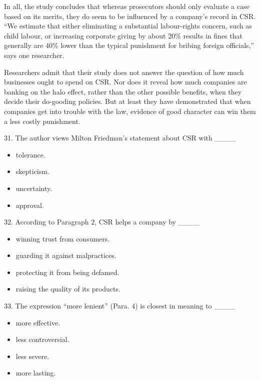 \documentclass[UTF8,11pt]{ctexart}
\begin{document}
In all, the study concludes that whereas prosecutors should only evaluate a case based on its merits, they do seem to be influenced by a company’s record in CSR. “We estimate that either eliminating a substantial labour-rights concern, such as child labour, or increasing corporate giving by about 20\% results in fines that generally are 40\% lower than the typical punishment for bribing foreign officials,” says one researcher.


Researchers admit that their study does not answer the question of how much businesses ought to spend on CSR. Nor does it reveal how much companies are banking on the halo effect, rather than the other possible benefits, when they decide their do-gooding policies. But at least they have demonstrated that when companies get into trouble with the law, evidence of good character can win them a less costly punishment.


31. The author views Milton Friedman’s statement about CSR with \_\_\_\_


\begin{itemize}[leftmargin=2em,itemsep=.2em,topsep=.4em]\item[A.] tolerance.
\item[B.] skepticism.
\item[C.] uncertainty.
\item[D.] approval.
\end{itemize}

32. According to Paragraph 2, CSR helps a company by \_\_\_\_


\begin{itemize}[leftmargin=2em,itemsep=.2em,topsep=.4em]\item[A.] winning trust from consumers.
\item[B.] guarding it against malpractices.
\item[C.] protecting it from being defamed.
\item[D.] raising the quality of its products.
\end{itemize}

33. The expression “more lenient” (Para. 4) is closest in meaning to \_\_\_\_


\begin{itemize}[leftmargin=2em,itemsep=.2em,topsep=.4em]\item[A.] more effective.
\item[B.] less controversial.
\item[C.] less severe.
\item[D.] more lasting.
\end{itemize}
\end{document}
